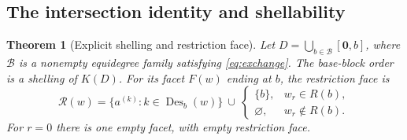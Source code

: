 \documentclass[11pt]{article}
\numberwithin{equation}{section}
\newtheorem{theorem}{Theorem}[section]
\theoremstyle{definition}
\theoremstyle{remark}
\newcommand{\zero}{\mathbf 0}
\newcommand{\B}{\mathcal B}
\begin{document}
\subsection{The intersection identity and shellability}

\begin{theorem}[Explicit shelling and restriction face]
\label{thm:abstract}
Let $D=\bigcup_{b\in\B}[\zero,b]$, where $\B$ is a nonempty equidegree family
satisfying \eqref{eq:exchange}. The base-block order is a shelling of $K(D)$.
For its facet $F(w)$ ending at $b$, the restriction face is
\begin{equation}
 \mathcal R(w)=
 \{a^{(k)}:k\in\operatorname{Des}_b(w)\}
 \ \cup\
 \begin{cases}
   \{b\},&w_r\in R(b),\\
   \varnothing,&w_r\notin R(b).
 \end{cases}
 \label{eq:restriction}
\end{equation}
For $r=0$ there is one empty facet, with empty restriction face.
\end{theorem}
\end{document}
